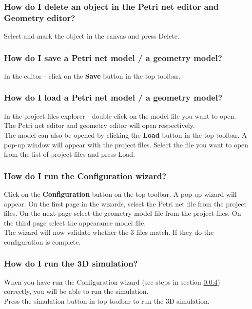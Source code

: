 \subsubsection{How do I delete an object in the Petri net editor and Geometry editor?}
Select and mark the object in the canvas and press Delete.

\subsubsection{How do I save a Petri net model / a geometry model?}
In the editor - click on the \textbf{Save} button in the top toolbar.

\subsubsection{How do I load a Petri net model / a geometry model?}
In the project files explorer - double-click on the model file you want to open. \\
The Petri net editor and geometry editor will open respectively. \\
\newline
The model can also be opened by clicking the \textbf{Load} button in the top toolbar.
A pop-up window will appear with the project files. Select the file you want to open from the list of project files and press Load. 

\subsubsection{How do I run the Configuration wizard?} \label{sec:conf_wizard}
Click on the \textbf{Configuration} button on the top toolbar. 
A pop-up wizard will appear. On the first page in the wizards, select the Petri net file from the project files. On the next page select the geometry model file from the project files. On the third page select the appearance model file. \\
The wizard will now validate whether the 3 files match. If they do the configuration is complete. 

\subsubsection{How do I run the 3D simulation?}
When you have run the Configuration wizard (see steps in section \ref{sec:conf_wizard}) correctly, you will be able to run the simulation. \\
Press the simulation button in top toolbar to run the 3D simulation. 
